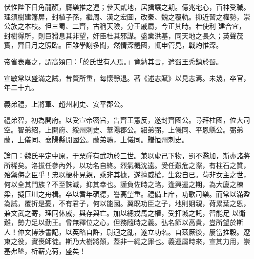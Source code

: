 \begin{pinyinscope}
 伏惟陛下日角龍顏，膺樂推之運；參天貳地，居揖讓之期。億兆宅心，百神受職。理須樹建籓屏，封植子孫，繼周、漢之宏圖，改秦、魏之覆軌。抑近習之權勢，崇公族之本枝。但三蜀、二齊，古稱天險，分王戚屬，今正其時。若使利
 建合宜，封樹得所，則巨猾息其非望，奸臣杜其邪謀。盛業洪基，同天地之長久；英聲茂實，齊日月之照臨。臣雖學謝多聞，然情深體國，輒申管見，戰灼惟深。



 帝省表嘉之，謂高熲曰：「於氏世有人焉。」竟納其言，遣蜀王秀鎮於蜀。



 宣敏常以盛滿之誡，昔賢所重，每懷靜退。著《述志賦》以見志焉。未幾，卒官，年二十九。



 義弟禮，上將軍、趙州刺史、安平郡公。



 禮弟智，初為開府。以受宣帝密旨，告齊王憲反，遂封齊國公。尋拜柱國，位大司空。智弟紹，上開府、綏州刺史、華陽郡公。紹弟弼，上儀同、平恩縣公。弼弟蘭，上儀同、襄陽縣開國公。蘭弟曠，上儀同。贈恒州刺史。



 論曰：魏氏平定中原，于栗磾有武功於三世。兼以虛己下物，罰不濫加，斯亦諸將所稀矣。洛拔任參內外，以功名自終。烈氣概沈遠。受任艱危之際，有柱石之質，殆禦侮之臣乎！忠以梗朴見親，乘非其據，遂擅威權，生殺自已。茍非女主之世，何以全其門族？不至誅滅，抑其幸也。謹負佐時之略，逢興運之期，為大廈之棟梁，擬巨川之舟楫。卒以耆年碩德，譽高望重。禮備上庠，功歌司樂。而常以滿盈為誡，覆折是憂，不有君子，何以能國。翼既功臣之子，地則姻親，荷累葉之恩，兼文武之寄，理同休戚，與存與亡。加以總戎馬之權，受扞城之託，智能足
 以衛難，勢力足以勤王。曾無釋位之心，但務隨時之義。弘名節以高貴，豈所望於斯人！仲文博涉書記，以英略自許，尉迥之亂，遂立功名。自茲厥後，屢當推穀。遼東之役，實喪師徒。斯乃大樹將顛，蓋非一繩之罪也。義運屬時來，宣其力用，崇基弗墜，析薪克荷，盛矣！



\end{pinyinscope}